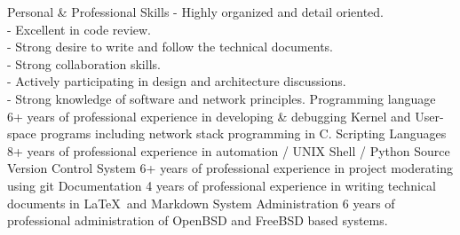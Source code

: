 \documentclass[12pt]{developercv}
\begin{document}
\begin{entrylist}
	\entry
		{}
		{Personal \& Professional Skills}
		{}
		{
			- Highly organized and detail oriented.\\
			- Excellent in code review.\\
			- Strong desire to write and follow the technical documents.\\
			- Strong collaboration skills.\\
			- Actively participating in design and architecture discussions.\\
			- Strong knowledge of software and network principles.
		}
	\entry
		{}
		{Programming language}
		{}
		{6+ years of professional experience in developing \& debugging Kernel and User-space programs including network stack programming in C.
		}
	\entry
		{}
		{Scripting Languages}
		{}
		{8+ years of professional experience in automation / UNIX Shell / Python
		}
	\entry
		{}
		{Source Version Control System}
		{}
		{6+ years of professional experience in project moderating using git}
	\entry
		{}
		{Documentation}
		{}
		{4 years of professional experience in writing technical documents in \LaTeX\ and Markdown}
	\entry
		{}
		{System Administration}
		{}
		{6 years of professional administration of OpenBSD and FreeBSD based systems.}
\end{entrylist}
\end{document}
